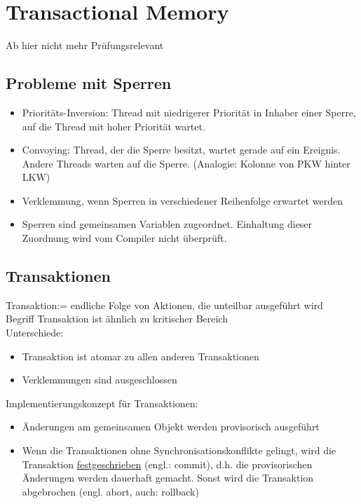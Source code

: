 \documentclass[a4paper,12pt]{scrartcl}
\begin{document}
\section{Transactional Memory}
Ab hier nicht mehr Prüfungsrelevant
\subsection{Probleme mit Sperren}

\begin{itemize}
 \item Prioritäts-Inversion: Thread mit niedrigerer Priorität in Inhaber einer Sperre, auf die Thread mit hoher Priorität wartet.
 \item Convoying: Thread, der die Sperre besitzt, wartet gerade auf ein Ereignis. Andere Threads warten auf die Sperre. (Analogie: Kolonne von PKW hinter LKW)
 \item Verklemmung, wenn Sperren in verschiedener Reihenfolge erwartet werden
 \item Sperren sind gemeinsamen Variablen zugeordnet. Einhaltung dieser Zuordnung wird vom Compiler nicht überprüft.
\end{itemize}

\subsection{Transaktionen}

Transaktion:= endliche Folge von Aktionen, die unteilbar ausgeführt wird\\
Begriff Transaktion ist ähnlich zu kritischer Bereich\\
Unterschiede:
\begin{itemize}
 \item Transaktion ist atomar zu allen anderen Transaktionen
 \item Verklemmungen sind ausgeschlossen
\end{itemize}

Implementierungskonzept für Transaktionen:
\begin{itemize}
 \item Änderungen am gemeinsamen Objekt werden provisorisch ausgeführt
 \item Wenn die Transaktionen ohne Synchronisationskonflikte gelingt, wird die Transaktion \underline{festgeschrieben} (engl.: commit), d.h. die provisorischen Änderungen werden dauerhaft gemacht. Sonst wird die Transaktion abgebrochen (engl. abort, auch: rollback)
\end{itemize}
\end{document}
